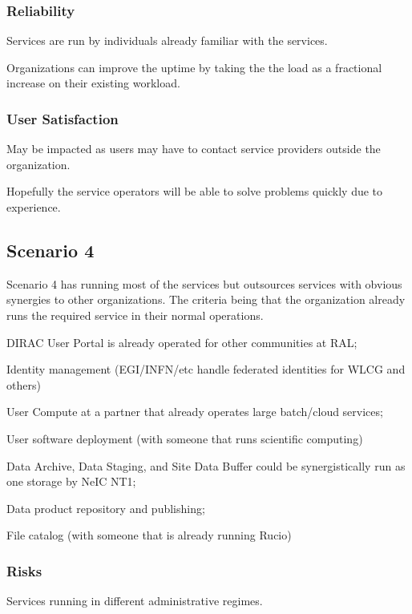 \documentclass[12pt,a4paper]{article}
\begin{document}
\subsubsection*{Reliability}
\bitm
\item Services are run by individuals already familiar with the services.
\item Organizations can improve the uptime by taking the the \ED load as a fractional increase on their existing workload.
\eitm

\subsubsection*{User Satisfaction}
\bitm
\item May be impacted as users may have to contact service providers outside the \EC organization.
  \item Hopefully the service operators will be able to solve problems quickly due to experience.
\eitm

\subsection{Scenario 4}
\label{ssec:scen4}

Scenario 4 has \EC running most of the services but outsources services with
obvious synergies to other organizations.
The criteria being that the organization already runs the required service in their normal
operations.
\bitm
\item DIRAC User Portal is already operated for other communities at RAL;
\item Identity management (EGI/INFN/etc handle federated identities for WLCG and others)
\item User Compute at a partner that already operates large batch/cloud services;
\item User software deployment (with someone that runs scientific computing)
\item Data Archive, Data Staging, and Site Data Buffer could be synergistically run as one storage by NeIC NT1;
\item Data product repository and publishing;
\item File catalog (with someone that is already running Rucio)
  \eitm
  
\subsubsection*{Risks}
\bitm
\item Services running in different administrative regimes.
\eitm
\end{document}
